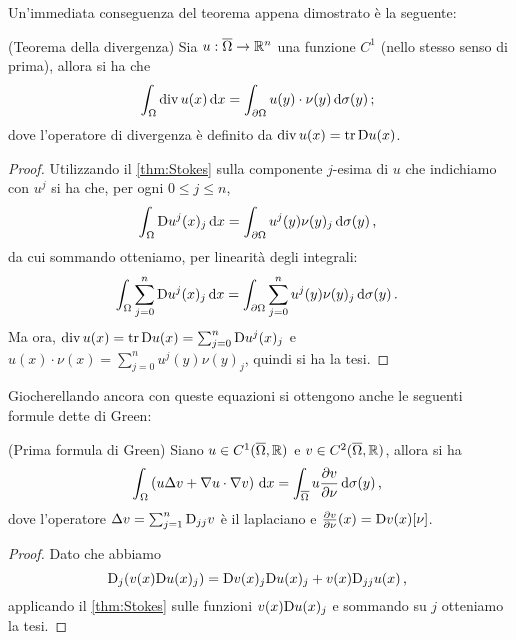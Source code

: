 Un'immediata conseguenza del teorema appena dimostrato è la seguente:

\begin{corollary}(Teorema della divergenza)
	\label{cor:thDivergenza}
	Sia $u:\overline\Omega \rightarrow \mathbb R^n$ una funzione $C^1$ (nello stesso senso di prima), allora si ha che
	\begin{equation}\label{eq:thDivergenza}
		\int_{\Omega} \operatorname{div} u (x) \,\mathrm d x = \int_{\partial \Omega} u(y)\cdot\nu(y) \,\mathrm d \sigma(y)\, \text{; }
	\end{equation}
	dove l'operatore di divergenza è definito da $\operatorname{div} u(x)=\operatorname{tr}\mathrm D u(x)$.
\end{corollary}

\begin{proof}
	Utilizzando il \cref{thm:Stokes} sulla componente $j$-esima di $u$ che indichiamo con $u^j$ si ha che, per ogni $0\leq j\leq n$,
	\[
		\int_{\Omega} \mathrm D u^j(x)_j \,\mathrm d x = \int_{\partial \Omega} u^j(y)\nu(y)_j \,\mathrm d \sigma(y)\, \text{, }
	\]
	da cui sommando otteniamo, per linearità degli integrali:
	\[
		\int_{\Omega} \sum_{j=0}^n\mathrm D u^j(x)_j \,\mathrm d x = \int_{\partial \Omega} \sum_{j=0}^n u^j(y)\nu(y)_j \,\mathrm d \sigma(y)\, \text{. }
	\]
	Ma ora, $\operatorname{div} u (x)= \operatorname{tr}\mathrm D u(x) = \sum_{j=0}^n \mathrm D u^j(x)_j$ e $u(x)\cdot\nu(x)=\sum_{j=0}^n u^j(y)\nu(y)_j$,
	quindi si ha la tesi.
\end{proof}

Giocherellando ancora con queste equazioni si ottengono anche le seguenti formule dette di Green:

\begin{corollary}(Prima formula di Green)
	Siano $u\in C^1(\overline\Omega, \mathbb R)$ e $v\in C^2(\overline\Omega, \mathbb R)$, allora si ha
	\[
		\int_{\Omega} \left( u \Delta v+ \nabla u\cdot\nabla v \right) \,\mathrm d x=
		\int_{\overline\Omega} u \frac{\partial v}{\partial \nu} \,\mathrm d \sigma(y) \, \text{, }
	\]
	dove l'operatore $\Delta v = \sum_{j=1}^n \mathrm D_{jj} v$ %
	è il laplaciano e $\frac{\partial v}{\partial \nu}(x)=\mathrm D v(x)[\nu]$.
\end{corollary}
\begin{proof}
	Dato che abbiamo 
	\begin{equation*}
		\mathrm D_j (v(x)\mathrm D u(x)_j ) = \mathrm D v(x)_j \mathrm D u(x)_j + v(x)\mathrm D_{jj} u(x)\, \text{, }
	\end{equation*} %
	applicando il \cref{thm:Stokes} sulle funzioni $v(x)\mathrm D u(x)_j$ e sommando su $j$ otteniamo la tesi. %
\end{proof}

